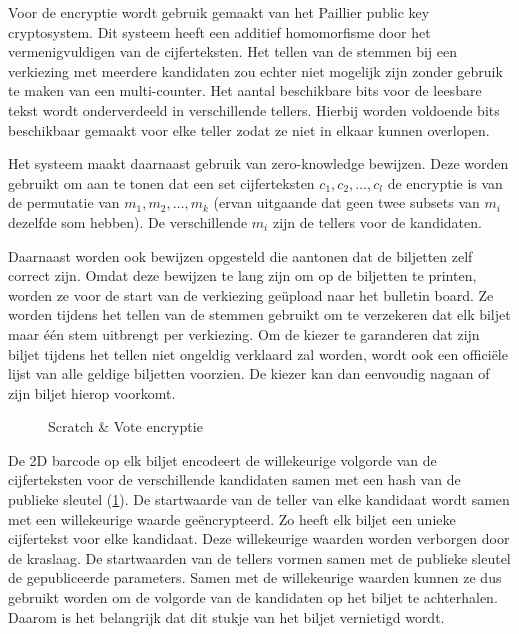 \npar Voor de encryptie wordt gebruik gemaakt van het Paillier public key cryptosystem. Dit systeem heeft een additief homomorfisme door het vermenigvuldigen van de cijferteksten. Het tellen van de stemmen bij een verkiezing met meerdere kandidaten zou echter niet mogelijk zijn zonder gebruik te maken van een multi-counter. Het aantal beschikbare bits voor de leesbare tekst wordt onderverdeeld in verschillende tellers. Hierbij worden voldoende bits beschikbaar gemaakt voor elke teller zodat ze niet in elkaar kunnen overlopen.

\npar Het systeem maakt daarnaast gebruik van zero-knowledge bewijzen. Deze worden gebruikt om aan te tonen dat een set cijferteksten $c_1, c_2, \ldots, c_l$ de encryptie is van de permutatie van $m_1, m_2, \ldots, m_k$ (ervan uitgaande dat geen twee subsets van ${m_i}$ dezelfde som hebben). De verschillende ${m_i}$ zijn de tellers voor de kandidaten.

\npar Daarnaast worden ook bewijzen opgesteld die aantonen dat de biljetten zelf correct zijn. Omdat deze bewijzen te lang zijn om op de biljetten te printen, worden ze voor de start van de verkiezing ge\"upload naar het bulletin board. Ze worden tijdens het tellen van de stemmen gebruikt om te verzekeren dat elk biljet maar \'e\'en stem uitbrengt per verkiezing. Om de kiezer te garanderen dat zijn biljet tijdens het tellen niet ongeldig verklaard zal worden, wordt ook een offici\"ele lijst van alle geldige biljetten voorzien. De kiezer kan dan eenvoudig nagaan of zijn biljet hierop voorkomt.

\begin{figure}[H]
  \caption{Scratch \& Vote encryptie\cite{adida_rivest_scratch_and_vote}}
  \label{fig:ls:scratch_and_vote_encryption}
\end{figure}

\npar De 2D barcode op elk biljet encodeert de willekeurige volgorde van de cijferteksten voor de verschillende kandidaten samen met een hash van de publieke sleutel (\ref{fig:ls:scratch_and_vote_encryption}). De startwaarde van de teller van elke kandidaat wordt samen met een willekeurige waarde ge\"encrypteerd. Zo heeft elk biljet een unieke cijfertekst voor elke kandidaat. Deze willekeurige waarden worden verborgen door de kraslaag. De startwaarden van de tellers vormen samen met de publieke sleutel de gepubliceerde parameters. Samen met de willekeurige waarden kunnen ze dus gebruikt worden om de volgorde van de kandidaten op het biljet te achterhalen. Daarom is het belangrijk dat dit stukje van het biljet vernietigd wordt.

